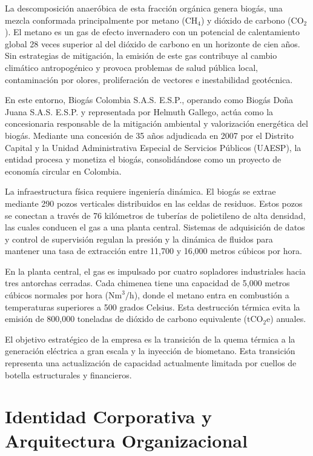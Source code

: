 \documentclass[11pt,letterpaper]{article}
\begin{document}
La descomposición anaeróbica de esta fracción orgánica genera biogás, una mezcla
conformada principalmente por metano ($\text{CH}_4$) y dióxido de carbono
($\text{CO}_2$). El metano es un gas de efecto invernadero con un potencial de
calentamiento global 28 veces superior al del dióxido de carbono en un horizonte
de cien años. Sin estrategias de mitigación, la emisión de este gas contribuye
al cambio climático antropogénico y provoca problemas de salud pública local,
contaminación por olores, proliferación de vectores e inestabilidad geotécnica.

En este entorno, Biogás Colombia S.A.S. E.S.P., operando como Biogás Doña Juana
S.A.S. E.S.P. y representada por Helmuth Gallego, actúa como la concesionaria
responsable de la mitigación ambiental y valorización energética del biogás.
Mediante una concesión de 35 años adjudicada en 2007 por el Distrito Capital y
la Unidad Administrativa Especial de Servicios Públicos (UAESP), la entidad
procesa y monetiza el biogás, consolidándose como un proyecto de economía
circular en Colombia.

La infraestructura física requiere ingeniería dinámica. El biogás se extrae
mediante 290 pozos verticales distribuidos en las celdas de residuos. Estos
pozos se conectan a través de 76 kilómetros de tuberías de polietileno de alta
densidad, las cuales conducen el gas a una planta central. Sistemas de
adquisición de datos y control de supervisión regulan la presión y la dinámica
de fluidos para mantener una tasa de extracción entre 11,700 y 16,000 metros
cúbicos por hora.

En la planta central, el gas es impulsado por cuatro sopladores industriales
hacia tres antorchas cerradas. Cada chimenea tiene una capacidad de 5,000 metros
cúbicos normales por hora ($\text{Nm}^3/\text{h}$), donde el metano entra en
combustión a temperaturas superiores a 500 grados Celsius. Esta destrucción
térmica evita la emisión de 800,000 toneladas de dióxido de carbono equivalente
($\text{tCO}_2\text{e}$) anuales.

El objetivo estratégico de la empresa es la transición de la quema térmica a la
generación eléctrica a gran escala y la inyección de biometano. Esta transición
representa una actualización de capacidad actualmente limitada por cuellos de
botella estructurales y financieros.

\newpage

\section{Identidad Corporativa y Arquitectura Organizacional}
\end{document}
